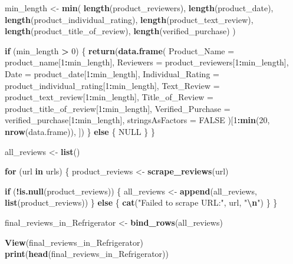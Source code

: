 \documentclass[
  11pt,
]{article}
\newenvironment{Shaded}{\begin{snugshade}}{\end{snugshade}}
\newcommand{\AttributeTok}[1]{\textcolor[rgb]{0.13,0.29,0.53}{#1}}
\newcommand{\ConstantTok}[1]{\textcolor[rgb]{0.56,0.35,0.01}{#1}}
\newcommand{\ControlFlowTok}[1]{\textcolor[rgb]{0.13,0.29,0.53}{\textbf{#1}}}
\newcommand{\DecValTok}[1]{\textcolor[rgb]{0.00,0.00,0.81}{#1}}
\newcommand{\FunctionTok}[1]{\textcolor[rgb]{0.13,0.29,0.53}{\textbf{#1}}}
\newcommand{\NormalTok}[1]{#1}
\newcommand{\OtherTok}[1]{\textcolor[rgb]{0.56,0.35,0.01}{#1}}
\newcommand{\SpecialCharTok}[1]{\textcolor[rgb]{0.81,0.36,0.00}{\textbf{#1}}}
\newcommand{\StringTok}[1]{\textcolor[rgb]{0.31,0.60,0.02}{#1}}
\begin{document}
\begin{Shaded}
\begin{Highlighting}[]
  
\NormalTok{  min\_length }\OtherTok{\textless{}{-}} \FunctionTok{min}\NormalTok{(}
    \FunctionTok{length}\NormalTok{(product\_reviewers),}
    \FunctionTok{length}\NormalTok{(product\_date),}
    \FunctionTok{length}\NormalTok{(product\_individual\_rating),}
    \FunctionTok{length}\NormalTok{(product\_text\_review),}
    \FunctionTok{length}\NormalTok{(product\_title\_of\_review),}
    \FunctionTok{length}\NormalTok{(verified\_purchase)}
\NormalTok{  )}
  
  
  \ControlFlowTok{if}\NormalTok{ (min\_length }\SpecialCharTok{\textgreater{}} \DecValTok{0}\NormalTok{) \{}
    \FunctionTok{return}\NormalTok{(}\FunctionTok{data.frame}\NormalTok{(}
      \AttributeTok{Product\_Name =}\NormalTok{ product\_name[}\DecValTok{1}\SpecialCharTok{:}\NormalTok{min\_length],}
      \AttributeTok{Reviewers =}\NormalTok{ product\_reviewers[}\DecValTok{1}\SpecialCharTok{:}\NormalTok{min\_length],}
      \AttributeTok{Date =}\NormalTok{ product\_date[}\DecValTok{1}\SpecialCharTok{:}\NormalTok{min\_length],}
      \AttributeTok{Individual\_Rating =}\NormalTok{ product\_individual\_rating[}\DecValTok{1}\SpecialCharTok{:}\NormalTok{min\_length],}
      \AttributeTok{Text\_Review =}\NormalTok{ product\_text\_review[}\DecValTok{1}\SpecialCharTok{:}\NormalTok{min\_length],}
      \AttributeTok{Title\_of\_Review =}\NormalTok{ product\_title\_of\_review[}\DecValTok{1}\SpecialCharTok{:}\NormalTok{min\_length],}
      \AttributeTok{Verified\_Purchase =}\NormalTok{ verified\_purchase[}\DecValTok{1}\SpecialCharTok{:}\NormalTok{min\_length],}
      \AttributeTok{stringsAsFactors =} \ConstantTok{FALSE}
\NormalTok{    )[}\DecValTok{1}\SpecialCharTok{:}\FunctionTok{min}\NormalTok{(}\DecValTok{20}\NormalTok{, }\FunctionTok{nrow}\NormalTok{(data.frame)), ])}
\NormalTok{  \} }\ControlFlowTok{else}\NormalTok{ \{}
    \ConstantTok{NULL}
\NormalTok{  \}}
\NormalTok{\}}


\NormalTok{all\_reviews }\OtherTok{\textless{}{-}} \FunctionTok{list}\NormalTok{()}


\ControlFlowTok{for}\NormalTok{ (url }\ControlFlowTok{in}\NormalTok{ urls) \{}
\NormalTok{  product\_reviews }\OtherTok{\textless{}{-}} \FunctionTok{scrape\_reviews}\NormalTok{(url)}
  
  \ControlFlowTok{if}\NormalTok{ (}\SpecialCharTok{!}\FunctionTok{is.null}\NormalTok{(product\_reviews)) \{}
\NormalTok{    all\_reviews }\OtherTok{\textless{}{-}} \FunctionTok{append}\NormalTok{(all\_reviews, }\FunctionTok{list}\NormalTok{(product\_reviews))}
\NormalTok{  \} }\ControlFlowTok{else}\NormalTok{ \{}
    \FunctionTok{cat}\NormalTok{(}\StringTok{"Failed to scrape URL:"}\NormalTok{, url, }\StringTok{"}\SpecialCharTok{\textbackslash{}n}\StringTok{"}\NormalTok{)}
\NormalTok{  \}}
\NormalTok{\}}


\NormalTok{final\_reviews\_in\_Refrigerator }\OtherTok{\textless{}{-}} \FunctionTok{bind\_rows}\NormalTok{(all\_reviews)}


\FunctionTok{View}\NormalTok{(final\_reviews\_in\_Refrigerator)}
\FunctionTok{print}\NormalTok{(}\FunctionTok{head}\NormalTok{(final\_reviews\_in\_Refrigerator))}
\end{Highlighting}
\end{Shaded}
\end{document}
